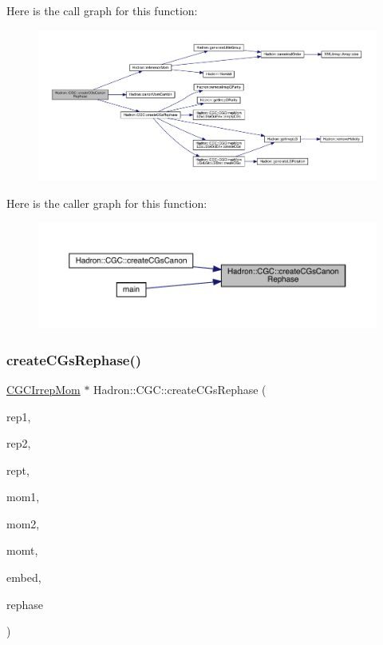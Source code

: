 Here is the call graph for this function\+:\nopagebreak
\begin{figure}[H]
\begin{center}
\leavevmode
\includegraphics[width=350pt]{d9/d19/namespaceHadron_1_1CGC_a47b736ab1ac22edb39f4b0df589a7053_cgraph}
\end{center}
\end{figure}
Here is the caller graph for this function\+:
\nopagebreak
\begin{figure}[H]
\begin{center}
\leavevmode
\includegraphics[width=350pt]{d9/d19/namespaceHadron_1_1CGC_a47b736ab1ac22edb39f4b0df589a7053_icgraph}
\end{center}
\end{figure}
\mbox{\label{namespaceHadron_1_1CGC_acb590dcbf6bd9f515f07a8e64aa76c0b}} 
\subsubsection{\texorpdfstring{createCGsRephase()}{createCGsRephase()}}
{\footnotesize\ttfamily \mbox{\hyperlink{classHadron_1_1CGCIrrepMom}{C\+G\+C\+Irrep\+Mom}} $\ast$ Hadron\+::\+C\+G\+C\+::create\+C\+Gs\+Rephase (\begin{DoxyParamCaption}\item[{const std\+::string \&}]{rep1,  }\item[{const std\+::string \&}]{rep2,  }\item[{const std\+::string \&}]{rept,  }\item[{const Array\+Int \&}]{mom1,  }\item[{const Array\+Int \&}]{mom2,  }\item[{const Array\+Int \&}]{momt,  }\item[{int}]{embed,  }\item[{bool}]{rephase }\end{DoxyParamCaption})}

